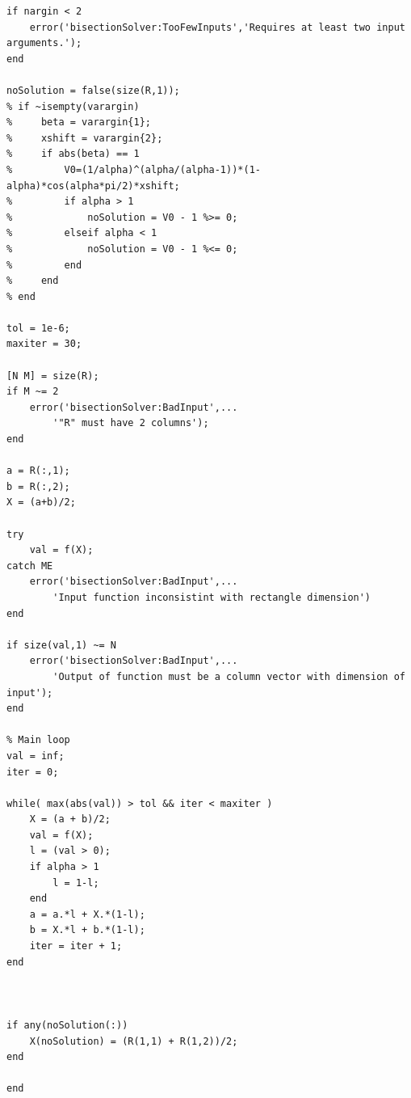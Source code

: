 \documentclass[twoside]{article}
\begin{document}
\begin{lstlisting}
if nargin < 2
    error('bisectionSolver:TooFewInputs','Requires at least two input arguments.'); 
end

noSolution = false(size(R,1));
% if ~isempty(varargin)
%     beta = varargin{1};
%     xshift = varargin{2};
%     if abs(beta) == 1
%         V0=(1/alpha)^(alpha/(alpha-1))*(1-alpha)*cos(alpha*pi/2)*xshift;
%         if alpha > 1
%             noSolution = V0 - 1 %>= 0;
%         elseif alpha < 1
%             noSolution = V0 - 1 %<= 0;
%         end
%     end 
% end
    
tol = 1e-6;
maxiter = 30;
    
[N M] = size(R);
if M ~= 2
    error('bisectionSolver:BadInput',...
        '"R" must have 2 columns');
end

a = R(:,1);
b = R(:,2);
X = (a+b)/2;

try
    val = f(X);
catch ME
    error('bisectionSolver:BadInput',...
        'Input function inconsistint with rectangle dimension')
end
  
if size(val,1) ~= N
    error('bisectionSolver:BadInput',...
        'Output of function must be a column vector with dimension of input');
end

% Main loop
val = inf;
iter = 0;

while( max(abs(val)) > tol && iter < maxiter )
    X = (a + b)/2;
    val = f(X);
    l = (val > 0);
    if alpha > 1
        l = 1-l;
    end
    a = a.*l + X.*(1-l);
    b = X.*l + b.*(1-l);
    iter = iter + 1;
end



if any(noSolution(:))
    X(noSolution) = (R(1,1) + R(1,2))/2;
end

end

\end{lstlisting}
\end{document}
